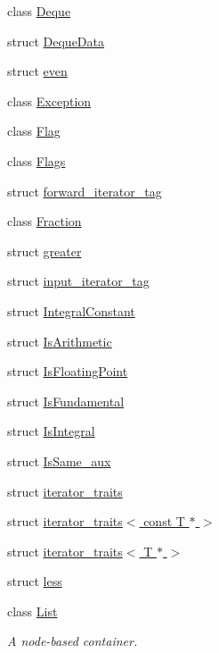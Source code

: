 \begin{DoxyCompactItemize}
\item 
class \hyperlink{classprism_1_1_deque}{Deque}
\item 
struct \hyperlink{structprism_1_1_deque_data}{Deque\+Data}
\item 
struct \hyperlink{structprism_1_1even}{even}
\item 
class \hyperlink{classprism_1_1_exception}{Exception}
\item 
class \hyperlink{classprism_1_1_flag}{Flag}
\item 
class \hyperlink{classprism_1_1_flags}{Flags}
\item 
struct \hyperlink{structprism_1_1forward__iterator__tag}{forward\+\_\+iterator\+\_\+tag}
\item 
class \hyperlink{classprism_1_1_fraction}{Fraction}
\item 
struct \hyperlink{structprism_1_1greater}{greater}
\item 
struct \hyperlink{structprism_1_1input__iterator__tag}{input\+\_\+iterator\+\_\+tag}
\item 
struct \hyperlink{structprism_1_1_integral_constant}{Integral\+Constant}
\item 
struct \hyperlink{structprism_1_1_is_arithmetic}{Is\+Arithmetic}
\item 
struct \hyperlink{structprism_1_1_is_floating_point}{Is\+Floating\+Point}
\item 
struct \hyperlink{structprism_1_1_is_fundamental}{Is\+Fundamental}
\item 
struct \hyperlink{structprism_1_1_is_integral}{Is\+Integral}
\item 
struct \hyperlink{structprism_1_1_is_same__aux}{Is\+Same\+\_\+aux}
\item 
struct \hyperlink{structprism_1_1iterator__traits}{iterator\+\_\+traits}
\item 
struct \hyperlink{structprism_1_1iterator__traits_3_01const_01_t_01_5_01_4}{iterator\+\_\+traits$<$ const T $\ast$ $>$}
\item 
struct \hyperlink{structprism_1_1iterator__traits_3_01_t_01_5_01_4}{iterator\+\_\+traits$<$ T $\ast$ $>$}
\item 
struct \hyperlink{structprism_1_1less}{less}
\item 
class \hyperlink{classprism_1_1_list}{List}
\begin{DoxyCompactList}\small\item\em A node-\/based container. \end{DoxyCompactList}\item 

\end{DoxyCompactItemize}
